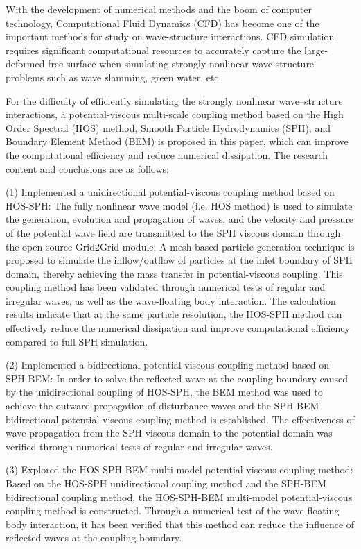 \begin{enabstract}
\label{sec:enabstract}%

With the development of numerical methods and the boom of computer technology, 
Computational Fluid Dynamics (CFD) has become one of the important methods for study on wave-structure interactions. 
CFD simulation requires significant computational resources to accurately capture the large-deformed free surface 
when simulating strongly nonlinear wave-structure problems such as wave slamming, green water, etc.

For the difficulty of efficiently simulating the strongly nonlinear wave–structure interactions, 
a potential-viscous multi-scale coupling method based on the High Order Spectral (HOS) method, 
Smooth Particle Hydrodynamics (SPH), and Boundary Element Method (BEM) is proposed in this paper, 
which can improve the computational efficiency and reduce numerical dissipation. 
The research content and conclusions are as follows: 

(1) Implemented a unidirectional potential-viscous coupling method based on HOS-SPH: 
The fully nonlinear wave model (i.e. HOS method) is used to simulate the generation, 
evolution and propagation of waves, and the velocity and pressure of the potential wave field 
are transmitted to the SPH viscous domain through the open source Grid2Grid module; 
A mesh-based particle generation technique is proposed to simulate the inflow/outflow 
of particles at the inlet boundary of SPH domain, 
thereby achieving the mass transfer in potential-viscous coupling. 
This coupling method has been validated through numerical tests of regular and irregular waves, 
as well as the wave-floating body interaction. 
The calculation results indicate that at the same particle resolution, 
the HOS-SPH method can effectively reduce the numerical dissipation 
and improve computational efficiency compared to full SPH simulation.

(2) Implemented a bidirectional potential-viscous coupling method based on SPH-BEM: 
In order to solve the reflected wave at the coupling boundary caused by the unidirectional coupling of HOS-SPH, 
the BEM method was used to achieve the outward propagation of disturbance waves 
and the SPH-BEM bidirectional potential-viscous coupling method is established. 
The effectiveness of wave propagation from the SPH viscous domain to the potential domain was verified 
through numerical tests of regular and irregular waves.

(3) Explored the HOS-SPH-BEM multi-model potential-viscous coupling method: 
Based on the HOS-SPH unidirectional coupling method and the SPH-BEM bidirectional coupling method, 
the HOS-SPH-BEM multi-model potential-viscous coupling method is constructed. 
Through a numerical test of the wave-floating body interaction, 
it has been verified that this method can reduce the influence of reflected waves at the coupling boundary.


\end{enabstract}
